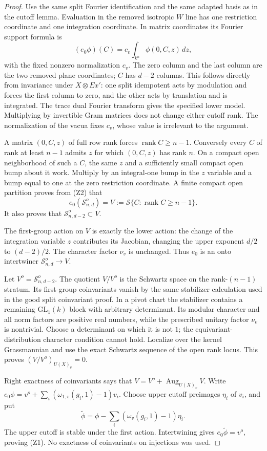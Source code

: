 \begin{proof}
Use the same split Fourier identification and the same adapted
basis as in the cutoff lemma. Evaluation in the removed isotropic
\(W\) line has one restriction coordinate and one integration
coordinate. In matrix coordinates its Fourier support formula is
\[
       (e_0\phi)(C)
             =c_v\int_{k^n}\phi(0,C,z)\,dz ,
 \tag{Z2}\label{eq:sr-theta-zero-evaluation-block}
\]
with the fixed nonzero normalization \(c_v\).
The zero column and the last column are the two removed plane
coordinates; \(C\) has \(d-2\) columns.
This follows directly from invariance under \(X\otimes Ex'\):
one split idempotent acts by modulation and forces the first
column to zero, and the other acts by translation and is
integrated. The trace dual Fourier transform gives the
specified lower model. Multiplying by invertible Gram matrices
does not change either cutoff rank. The normalization of the
vacua fixes \(c_v\), whose value is irrelevant to the argument.

A matrix \((0,C,z)\) of full row rank forces
\(\operatorname{rank}C\ge n-1\).
Conversely every \(C\) of rank at least \(n-1\) admits \(z\)
for which \((0,C,z)\) has rank \(n\).
On a compact open neighborhood of such a \(C\), the same
\(z\) and a sufficiently small compact open bump about it work.
Multiply by an integral-one bump in the \(z\) variable and
a bump equal to one at the zero restriction coordinate.
A finite compact open partition proves from (Z2) that
\[
 e_0(\mathcal S^o_{n,d})
       =V:=\mathcal S\{C:\operatorname{rank}C\ge n-1\}.
\]
It also proves that \(\mathcal S^o_{n,d-2}\subset V\).

The first-group action on \(V\) is exactly the lower action:
the change of the integration variable \(z\) contributes its
Jacobian, changing the upper exponent \(d/2\) to
\((d-2)/2\). The character factor \(\nu_v\) is unchanged.
Thus \(e_0\) is an onto intertwiner
\(\mathcal S^o_{n,d}\longrightarrow V\).

Let \(V^o=\mathcal S^o_{n,d-2}\). The quotient \(V/V^o\)
is the Schwartz space on the rank-\((n-1)\) stratum.
Its first-group coinvariants vanish by the same stabilizer
calculation used in the good split coinvariant proof.
In a pivot chart the stabilizer contains a remaining
\(\mathrm{GL}_1(k)\) block with arbitrary determinant.
Its modular character and all norm factors are positive
real numbers, while the prescribed unitary factor
\(\nu_v\) is nontrivial. Choose a determinant on which it is
not \(1\); the equivariant-distribution character condition
cannot hold. Localize over the kernel Grassmannian and use
the exact Schwartz sequence of the open rank locus.
This proves
\((V/V^o)_{U(X)_v}=0\).

Right exactness of coinvariants says that
\(V=V^o+\operatorname{Aug}_{U(X)_v}V\).
Write \(e_0\phi=v^o+\sum_i(\omega_{1,v}(g_i,1)-1)v_i\).
Choose upper cutoff preimages \(\eta_i\) of \(v_i\), and put
\[
 \widetilde\phi
       =\phi-\sum_i(\omega_v(g_i,1)-1)\eta_i.
\]
The upper cutoff is stable under the first action.
Intertwining gives \(e_0\widetilde\phi=v^o\), proving (Z1).
No exactness of coinvariants on injections was used.
\end{proof}

